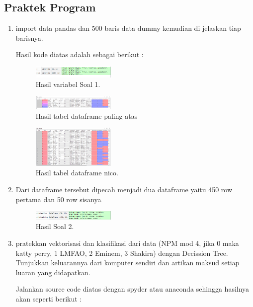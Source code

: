 \subsection{Praktek Program}
\begin{enumerate}
	\item import data pandas dan 500 baris data dummy kemudian di jelaskan tiap barisnya.
	\hfill\break
	
	Hasil kode diatas adalah sebagai berikut :
	\begin{figure}[H]
	\centering
		\includegraphics[width=4cm]{figures/1174096/tugas4/hasil1-1.PNG}
		\caption{Hasil variabel Soal 1.}
	\end{figure}
    \begin{figure}[H]
	\centering
		\includegraphics[width=4cm]{figures/1174096/tugas4/hasil1-2.PNG}
		\caption{Hasil tabel dataframe paling atas}
	\end{figure}
    \begin{figure}[H]
	\centering
		\includegraphics[width=4cm]{figures/1174096/tugas4/hasil1-3.PNG}
		\caption{Hasil tabel dataframe nico.}
	\end{figure}

	\item Dari dataframe tersebut dipecah menjadi dua dataframe yaitu 450 row pertama dan 50 row sisanya
	\hfill\break
	
	
	\begin{figure}[H]
	\centering
		\includegraphics[width=4cm]{figures/1174096/tugas4/hasil2.PNG}
		\caption{Hasil Soal 2.}
	\end{figure}

	\item  pratekkan vektorisasi dan klasiﬁkasi dari data (NPM mod 4, jika 0 maka katty perry, 1 LMFAO, 2 Eminem, 3 Shakira) dengan Decission Tree. Tunjukkan keluarannya dari komputer sendiri dan artikan maksud setiap luaran yang didapatkan.
	\hfill\break
	
	Jalankan source code diatas dengan spyder atau anaconda sehingga hasilnya akan seperti berikut : 


\end{enumerate}

